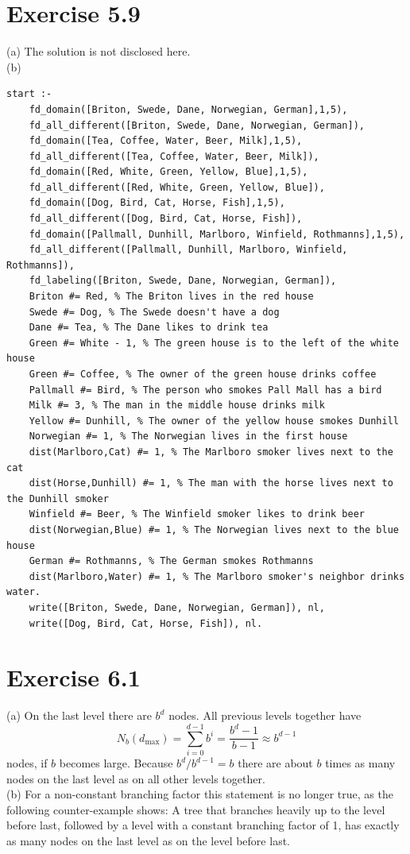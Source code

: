 \documentclass[10pt]{book}
\begin{document}
\section{Exercise 5.9}
(a) The solution is not disclosed here.\\
(b)
\begin{verbatim}
start :-
    fd_domain([Briton, Swede, Dane, Norwegian, German],1,5),
    fd_all_different([Briton, Swede, Dane, Norwegian, German]),
    fd_domain([Tea, Coffee, Water, Beer, Milk],1,5),
    fd_all_different([Tea, Coffee, Water, Beer, Milk]),
    fd_domain([Red, White, Green, Yellow, Blue],1,5),
    fd_all_different([Red, White, Green, Yellow, Blue]),
    fd_domain([Dog, Bird, Cat, Horse, Fish],1,5),
    fd_all_different([Dog, Bird, Cat, Horse, Fish]),
    fd_domain([Pallmall, Dunhill, Marlboro, Winfield, Rothmanns],1,5),
    fd_all_different([Pallmall, Dunhill, Marlboro, Winfield, Rothmanns]),
    fd_labeling([Briton, Swede, Dane, Norwegian, German]),
    Briton #= Red, % The Briton lives in the red house
    Swede #= Dog, % The Swede doesn't have a dog
    Dane #= Tea, % The Dane likes to drink tea
    Green #= White - 1, % The green house is to the left of the white house
    Green #= Coffee, % The owner of the green house drinks coffee
    Pallmall #= Bird, % The person who smokes Pall Mall has a bird
    Milk #= 3, % The man in the middle house drinks milk
    Yellow #= Dunhill, % The owner of the yellow house smokes Dunhill
    Norwegian #= 1, % The Norwegian lives in the first house
    dist(Marlboro,Cat) #= 1, % The Marlboro smoker lives next to the cat
    dist(Horse,Dunhill) #= 1, % The man with the horse lives next to the Dunhill smoker
    Winfield #= Beer, % The Winfield smoker likes to drink beer
    dist(Norwegian,Blue) #= 1, % The Norwegian lives next to the blue house
    German #= Rothmanns, % The German smokes Rothmanns
    dist(Marlboro,Water) #= 1, % The Marlboro smoker's neighbor drinks water.
    write([Briton, Swede, Dane, Norwegian, German]), nl,
    write([Dog, Bird, Cat, Horse, Fish]), nl.
\end{verbatim}

\section{Exercise 6.1}
(a) On the last level there are $b^{d}$ nodes. All previous levels together have
\[
N_{b}\left(d_{\max}\right)=\sum_{i=0}^{d-1} b^{i}=\frac{b^{d}-1}{b-1} \approx b^{d-1}
\]
nodes, if $b$ becomes large. Because $b^{d} / b^{d-1}=b$ there are about $b$ times as many nodes on the last level as on all other levels together.\\
(b) For a non-constant branching factor this statement is no longer true, as the following counter-example shows: A tree that branches heavily up to the level before last, followed by a level with a constant branching factor of 1, has exactly as many nodes on the last level as on the level before last.
\end{document}
